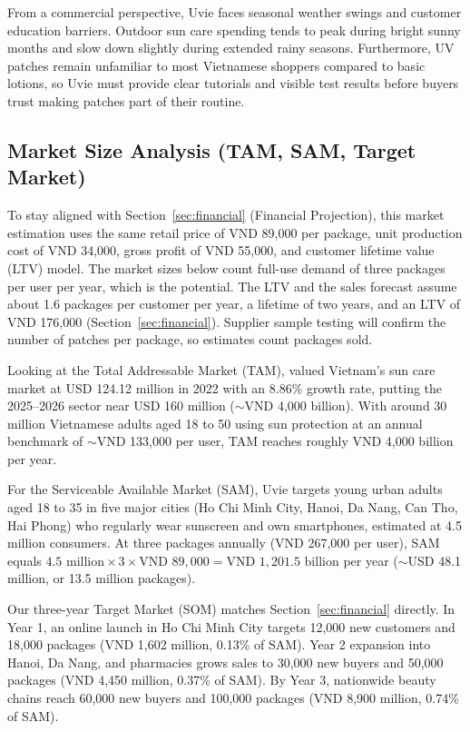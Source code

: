 From a commercial perspective, Uvie faces seasonal weather swings and customer
education barriers. Outdoor sun care spending tends to peak during bright sunny
months and slow down slightly during extended rainy seasons. Furthermore, UV
patches remain unfamiliar to most Vietnamese shoppers compared to basic lotions,
so Uvie must provide clear tutorials and visible test results before buyers trust
making patches part of their routine.

\subsection{Market Size Analysis (TAM, SAM, Target Market)}\label{sec:market-size}
To stay aligned with Section~\ref{sec:financial} (Financial Projection), this
market estimation uses the same retail price of VND 89,000 per package, unit
production cost of VND 34,000, gross profit of VND 55,000, and customer lifetime
value (LTV) model. The market sizes below count full-use demand of three packages
per user per year, which is the potential. The LTV and the sales forecast assume
about 1.6 packages per customer per year, a lifetime of two years, and an LTV of
VND 176,000 (Section~\ref{sec:financial}). Supplier sample testing will confirm the
number of patches per package, so estimates count packages sold.

Looking at the Total Addressable Market (TAM), \citet{marketsdata2023} valued
Vietnam's sun care market at USD 124.12 million in 2022 with an 8.86\% growth
rate, putting the 2025--2026 sector near USD 160 million ($\sim$VND 4,000
billion). With around 30 million Vietnamese adults aged 18 to 50 using sun
protection at an annual benchmark of $\sim$VND 133,000 per user, TAM reaches
roughly VND 4,000 billion per year.

For the Serviceable Available Market (SAM), Uvie targets young urban adults aged
18 to 35 in five major cities (Ho Chi Minh City, Hanoi, Da Nang, Can Tho, Hai
Phong) who regularly wear sunscreen and own smartphones, estimated at 4.5 million
consumers. At three packages annually (VND 267,000 per user), SAM equals
$4.5\text{ million} \times 3 \times \text{VND } 89{,}000 = \text{VND } 1{,}201.5$
billion per year ($\sim$USD 48.1 million, or 13.5 million packages).

Our three-year Target Market (SOM) matches Section~\ref{sec:financial} directly.
In Year 1, an online launch in Ho Chi Minh City targets 12,000 new customers and
18,000 packages (VND 1,602 million, 0.13\% of SAM). Year 2 expansion into Hanoi,
Da Nang, and pharmacies grows sales to 30,000 new buyers and 50,000 packages
(VND 4,450 million, 0.37\% of SAM). By Year 3, nationwide beauty chains reach
60,000 new buyers and 100,000 packages (VND 8,900 million, 0.74\% of SAM).


